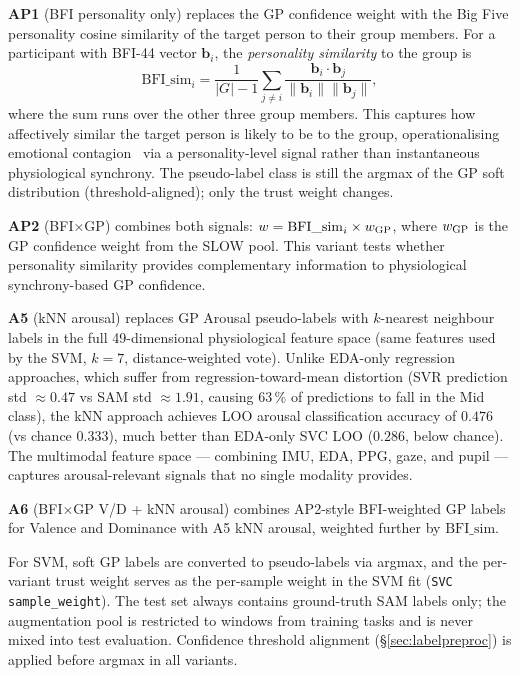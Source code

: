 \documentclass[sigconf,nonacm]{acmart}
\begin{document}
\textbf{AP1} (BFI personality only) replaces the GP confidence weight with
the Big Five personality cosine similarity of the target person to their group
members.
For a participant with BFI-44 vector $\mathbf{b}_i$, the \emph{personality
similarity} to the group is
\begin{equation}
  \mathrm{BFI\_sim}_i = \frac{1}{|G|-1}\sum_{j \neq i}
    \frac{\mathbf{b}_i \cdot \mathbf{b}_j}{\|\mathbf{b}_i\|\|\mathbf{b}_j\|},
\end{equation}
where the sum runs over the other three group members.
This captures how affectively similar the target person is likely to be
to the group, operationalising emotional contagion~\cite{hatfield1993emotional}
via a personality-level signal rather than instantaneous physiological synchrony.
The pseudo-label class is still the argmax of the GP soft distribution
(threshold-aligned); only the trust weight changes.

\textbf{AP2} (BFI$\times$GP) combines both signals:
$w = \mathrm{BFI\_sim}_i \times w_{\rm GP}$,
where $w_{\rm GP}$ is the GP confidence weight from the SLOW pool.
This variant tests whether personality similarity provides complementary
information to physiological synchrony-based GP confidence.

\textbf{A5} (kNN arousal) replaces GP Arousal pseudo-labels with $k$-nearest
neighbour labels in the full 49-dimensional physiological feature space
(same features used by the SVM, $k{=}7$, distance-weighted vote).
Unlike EDA-only regression approaches, which suffer from regression-toward-mean
distortion (SVR prediction std ${\approx}0.47$ vs SAM std ${\approx}1.91$,
causing 63\,\% of predictions to fall in the Mid class), the kNN approach
achieves LOO arousal classification accuracy of $0.476$ (vs chance $0.333$),
much better than EDA-only SVC LOO ($0.286$, below chance).
The multimodal feature space --- combining IMU, EDA, PPG, gaze, and pupil ---
captures arousal-relevant signals that no single modality provides.

\textbf{A6} (BFI$\times$GP V/D + kNN arousal) combines AP2-style
BFI-weighted GP labels for Valence and Dominance with A5 kNN arousal,
weighted further by $\mathrm{BFI\_sim}$.

For SVM, soft GP labels are converted to pseudo-labels via argmax, and the
per-variant trust weight serves as the per-sample weight in the SVM fit
(\texttt{SVC sample\_weight}).
The test set always contains ground-truth SAM labels only; the augmentation
pool is restricted to windows from training tasks and is never mixed into test
evaluation.
Confidence threshold alignment (\S\ref{sec:labelpreproc}) is applied before
argmax in all variants.
\end{document}
